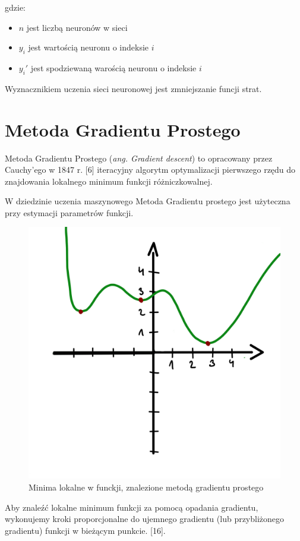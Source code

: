 \documentclass[brudnopis]{xmgr}
\begin{document}
gdzie: 

\begin{itemize}
\item $n$ jest liczbą neuronów w sieci
\item $y_i$ jest wartością neuronu o indeksie $i$ 
\item $y_i'$ jest spodziewaną warością neuronu o indeksie $i$ 
\end{itemize}

Wyznacznikiem uczenia sieci neuronowej jest zmniejszanie funcji strat. 


 \section{Metoda Gradientu Prostego\label{s:dsssl}}

Metoda Gradientu Prostego (\textit{ang. Gradient descent}) to opracowany przez Cauchy'ego w 1847 r. [6] iteracyjny algorytm optymalizacji pierwszego rzędu do znajdowania lokalnego minimum funkcji różniczkowalnej.

W dziedzinie uczenia maszynowego Metoda Gradientu prostego jest użyteczna przy estymacji parametrów funkcji. 


\begin{figure}[!tbh]
\centering
\includegraphics[width=.8\hsize]{fig/11}
\caption{Minima lokalne w funckji, znalezione metodą gradientu prostego\label{RYS.3}}
\end{figure}

Aby znaleźć lokalne minimum funkcji za pomocą opadania gradientu, wykonujemy kroki proporcjonalne do ujemnego gradientu (lub przybliżonego gradientu) funkcji w bieżącym punkcie.  [16]. 
\end{document}
